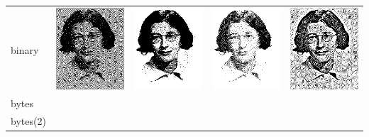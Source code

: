 \begin{tabular}{l|cccc}
	binary &
	\href{z-psimone-errdif.png}{\includegraphics{psimone-errdif.png}}  &
	\href{z-psimone-gamdit.png}{\includegraphics{psimone-gamdit.png}}  &
	\href{z-psimone-ugamdit.png}{\includegraphics{psimone-ugamdit.png}} &
	\href{z-psimone-retdit.png}{\includegraphics{psimone-retdit.png}}  \\
	bytes &
	 &
	 &
	 &
	 \\
	bytes(2) &
	 &
	 &
	 &
	 \\
\end{tabular}
